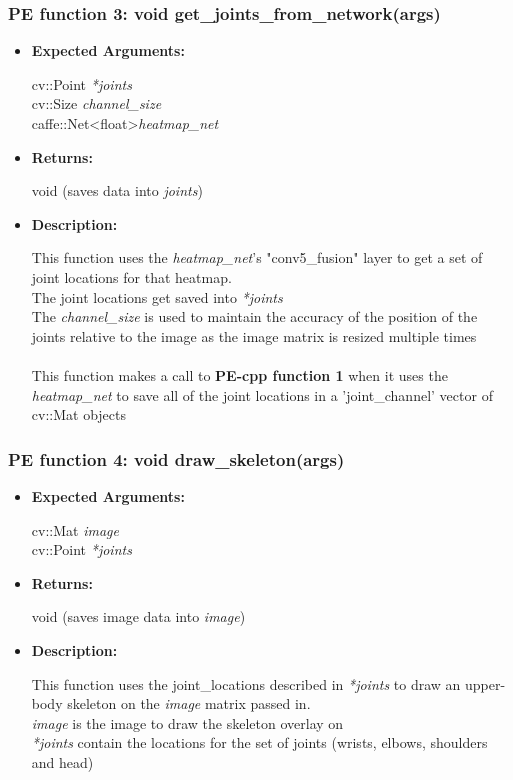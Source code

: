 \documentclass{scrreprt}
\begin{document}
\subsubsection{PE function 3: void get\_joints\_from\_network(args)}
\begin{itemize}
    \item \textbf{Expected Arguments:}

    cv::Point \quad\textit{*joints}
    \\
    cv::Size \quad\textit{channel\_size}
    \\
    caffe::Net\textless float\textgreater\quad\textit{heatmap\_net}

    \item \textbf{Returns:}

    void (saves data into \textit{joints})

    \item \textbf{Description:}

    This function uses the \textit{heatmap\_net}'s "conv5\_fusion" layer to get a set of joint locations for that heatmap.
    \\
    The joint locations get saved into \textit{*joints}
    \\
    The \textit{channel\_size} is used to maintain the accuracy of the position of the joints relative to the image as the image matrix is resized multiple times
    \\\\
    This function makes a call to \textbf{PE-cpp function 1} when it uses the \textit{heatmap\_net} to save all of the joint locations in a 'joint\_channel' vector of cv::Mat objects
\end{itemize}


\subsubsection{PE function 4: void draw\_skeleton(args)}
\begin{itemize}
    \item \textbf{Expected Arguments:}

    cv::Mat \quad\textit{image}
    \\
    cv::Point \quad\textit{*joints}

    \item \textbf{Returns:}

    void (saves image data into \textit{image})

    \item \textbf{Description:}

    This function uses the joint\_locations described in \textit{*joints} to draw an upper-body skeleton on the \textit{image} matrix passed in.
    \\
    \textit{image} is the image to draw the skeleton overlay on
    \\
    \textit{*joints} contain the locations for the set of joints (wrists, elbows, shoulders and head)
\end{itemize}
\end{document}
